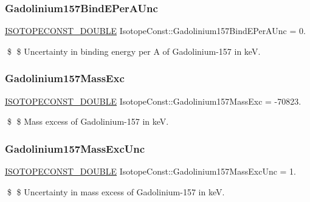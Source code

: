 \subsubsection{\texorpdfstring{Gadolinium157\+Bind\+E\+Per\+A\+Unc}{Gadolinium157BindEPerAUnc}}
{\footnotesize\ttfamily \mbox{\hyperlink{group___isotope_const-_macros_ga8f45a7272ce02c0b4c65c44636ed719a}{I\+S\+O\+T\+O\+P\+E\+C\+O\+N\+S\+T\+\_\+\+D\+O\+U\+B\+LE}} Isotope\+Const\+::\+Gadolinium157\+Bind\+E\+Per\+A\+Unc = 0.}

\$ \$ Uncertainty in binding energy per A of Gadolinium-\/157 in keV. \mbox{\label{group___isotope_const-_gadolinium-_gd157_ga87b05cfdb14655f60bc69ea3b1b6b10a}} 
\subsubsection{\texorpdfstring{Gadolinium157\+Mass\+Exc}{Gadolinium157MassExc}}
{\footnotesize\ttfamily \mbox{\hyperlink{group___isotope_const-_macros_ga8f45a7272ce02c0b4c65c44636ed719a}{I\+S\+O\+T\+O\+P\+E\+C\+O\+N\+S\+T\+\_\+\+D\+O\+U\+B\+LE}} Isotope\+Const\+::\+Gadolinium157\+Mass\+Exc = -\/70823.}

\$ \$ Mass excess of Gadolinium-\/157 in keV. \mbox{\label{group___isotope_const-_gadolinium-_gd157_ga4bb14dfea2fad5613640b3c2a7602d01}} 
\subsubsection{\texorpdfstring{Gadolinium157\+Mass\+Exc\+Unc}{Gadolinium157MassExcUnc}}
{\footnotesize\ttfamily \mbox{\hyperlink{group___isotope_const-_macros_ga8f45a7272ce02c0b4c65c44636ed719a}{I\+S\+O\+T\+O\+P\+E\+C\+O\+N\+S\+T\+\_\+\+D\+O\+U\+B\+LE}} Isotope\+Const\+::\+Gadolinium157\+Mass\+Exc\+Unc = 1.}

\$ \$ Uncertainty in mass excess of Gadolinium-\/157 in keV. \mbox{\label{group___isotope_const-_gadolinium-_gd157_ga2506f92a71c303e27bf38d90ff847449}} 
